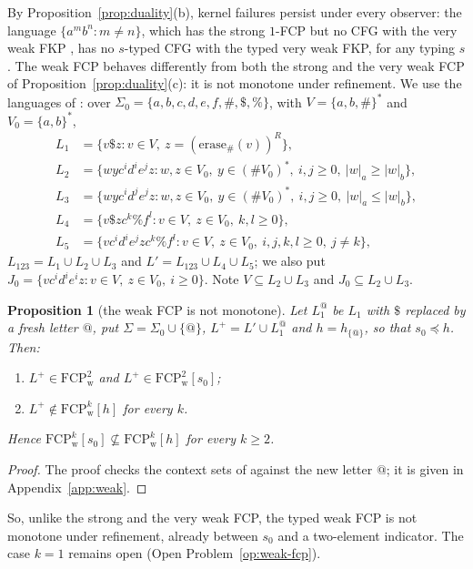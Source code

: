 \documentclass[11pt]{article}
\numberwithin{equation}{section}
\theoremstyle{plain}
\newtheorem{proposition}[theorem]{Proposition}
\theoremstyle{definition}
\theoremstyle{remark}
\theoremstyle{plain}
\newcommand{\FCP}[2]{\mathrm{FCP}^{#1}_{\mathrm{#2}}}
\newcommand{\tFCP}[3]{\mathrm{FCP}^{#1}_{\mathrm{#2}}[#3]}
\begin{document}
By Proposition~\ref{prop:duality}(b), kernel failures persist under every
observer: the language $\{a^mb^n:m\ne n\}$, which has the strong
$1$-FCP but no CFG with the very weak FKP \citep[Prop.~2(ii)]{ky2017}, has no
$s$-typed CFG with the typed very weak FKP, for any typing $s$.
The weak FCP behaves differently from both the strong and the very weak
FCP of Proposition~\ref{prop:duality}(c): it is not monotone under refinement.
We use the languages of \citet[Secs.~5--6]{ky2017}: over
$\Sigma_0=\{a,b,c,d,e,f,\#,\$,\%\}$, with $V=\{a,b,\#\}^*$ and $V_0=\{a,b\}^*$,
\begin{align*}
L_1&=\{v\$z: v\in V,\ z=(\mathrm{erase}_\#(v))^R\},\\
L_2&=\{wyc^id^ie^jz: w,z\in V_0,\ y\in(\#V_0)^*,\ i,j\ge0,\ |w|_a\ge|w|_b\},\\
L_3&=\{wyc^id^je^jz: w,z\in V_0,\ y\in(\#V_0)^*,\ i,j\ge0,\ |w|_a\le|w|_b\},\\
L_4&=\{v\$zc^k\%f^l: v\in V,\ z\in V_0,\ k,l\ge0\},\\
L_5&=\{vc^id^ie^jzc^k\%f^l: v\in V,\ z\in V_0,\ i,j,k,l\ge0,\ j\ne k\},
\end{align*}
$L_{123}=L_1\cup L_2\cup L_3$ and $L'=L_{123}\cup L_4\cup L_5$; we also put
$J_0=\{vc^id^ie^iz: v\in V,\ z\in V_0,\ i\ge0\}$.  Note $V\subseteq L_2\cup L_3$
and $J_0\subseteq L_2\cup L_3$.

\begin{proposition}[the weak FCP is not monotone]\label{prop:weak-not-preserved}
Let $L_1^@$ be $L_1$ with $\$$ replaced by a fresh letter $@$, put
$\Sigma=\Sigma_0\cup\{@\}$, $L^+=L'\cup L_1^@$ and $h=h_{\{@\}}$, so that
$s_0\preceq h$.  Then:
\begin{enumerate}[label=\textup{(\alph*)},nosep]
\item $L^+\in\FCP2{w}$ and $L^+\in\tFCP2{w}{s_0}$;
\item $L^+\notin\tFCP{k}{w}{h}$ for every $k$.
\end{enumerate}
Hence $\tFCP{k}{w}{s_0}\not\subseteq\tFCP{k}{w}{h}$ for every $k\ge2$.
\end{proposition}
\begin{proof}
The proof checks the context sets of \citet[Lemmas~8 and~12]{ky2017}
against the new letter $@$; it is given in Appendix~\ref{app:weak}.
\end{proof}

So, unlike the strong and the very weak FCP, the typed weak FCP is not
monotone under refinement, already between $s_0$ and a two-element
indicator.  The case $k=1$ remains open (Open Problem~\ref{op:weak-fcp}).
\end{document}
